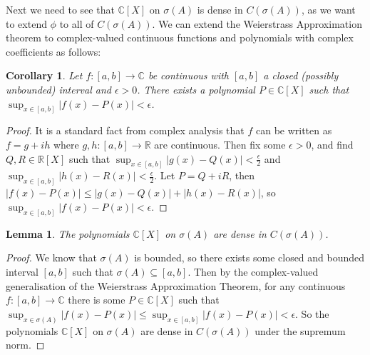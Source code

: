 \documentclass[12pt,oneside]{report}
\newtheorem{cor}[thm]{Corollary}
\newtheorem{lem}[thm]{Lemma}
\begin{document}
Next we need to see that $\mathbb{C}[X]$ on $\sigma(A)$ is dense in $C(\sigma(A))$, as we want to extend $\phi$ to all of $C(\sigma(A))$. We can extend the Weierstrass Approximation theorem to complex-valued continuous functions and polynomials with complex coefficients as follows:

\begin{cor}
    Let $f: [a,b] \to \mathbb{\mathbb{C}}$ be continuous with $[a,b]$ a closed (possibly unbounded) interval and $\epsilon > 0$. There exists a polynomial $P \in \mathbb{\mathbb{C}}[X]$ such that $\sup_{x \in [a,b]}|f(x) - P(x)| < \epsilon$.
\end{cor}
\begin{proof}
    It is a standard fact from complex analysis that $f$ can be written as $f = g + ih$ where $g,h: [a,b] \to \mathbb{R}$ are continuous. Then fix some $\epsilon > 0$, and find $Q,R \in \mathbb{R}[X]$ such that $\sup_{x\in[a,b]} |g(x) - Q(x)| < \frac{\epsilon}{2}$ and $\sup_{x\in[a,b]} |h(x) - R(x)| < \frac{\epsilon}{2}$. Let $P = Q + iR$, then $|f(x) - P(x)| \leq |g(x) - Q(x)| + |h(x) - R(x)|$, so $\sup_{x\in[a,b]}|f(x) - P(x)| < \epsilon$.
\end{proof}

\begin{lem}
    The polynomials $\mathbb{C}[X]$ on $\sigma(A)$ are dense in $C(\sigma(A))$.
\end{lem}
\begin{proof}
    We know that $\sigma(A)$ is bounded, so there exists some closed and bounded interval $[a,b]$ such that $\sigma(A) \subseteq [a,b]$. Then by the complex-valued generalisation of the Weierstrass Approximation Theorem, for any continuous $f: [a,b] \to \mathbb{C}$ there is some $P \in \mathbb{C}[X]$ such that $\sup_{x\in\sigma(A)} |f(x) - P(x)| \leq \sup_{x\in[a,b]} |f(x) - P(x)| < \epsilon$. So the polynomials $\mathbb{C}[X]$ on $\sigma(A)$ are dense in $C(\sigma(A))$ under the supremum norm.
\end{proof}
\end{document}
